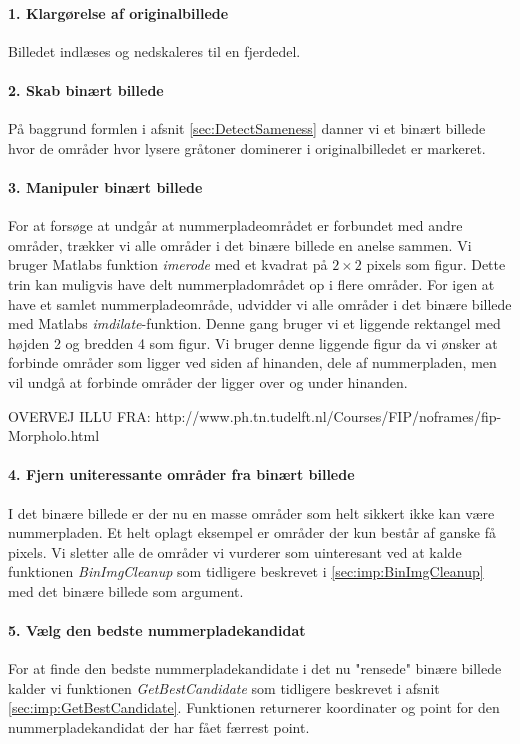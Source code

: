 \paragraph{1. Klargørelse af originalbillede}
Billedet indlæses og nedskaleres til en fjerdedel. 

\paragraph{2. Skab binært billede}
På baggrund formlen i afsnit \ref{sec:DetectSameness} danner vi et binært billede hvor de områder hvor lysere gråtoner dominerer i originalbilledet er markeret.

\paragraph{3. Manipuler binært billede}
For at forsøge at undgår at nummerpladeområdet er forbundet med andre områder, trækker vi alle områder i det binære billede en anelse sammen. Vi bruger Matlabs funktion \textit{imerode} med et kvadrat på $2 \times 2$ pixels som figur. Dette trin kan muligvis have delt nummerpladområdet op i flere områder. For igen at have et samlet nummerpladeområde, udvidder vi alle områder i det binære billede med Matlabs \textit{imdilate}-funktion. Denne gang bruger vi et liggende rektangel med højden 2 og bredden 4 som figur. Vi bruger denne liggende figur da vi ønsker at forbinde områder som ligger ved siden af hinanden, dele af nummerpladen, men vil undgå at forbinde områder der ligger over og under hinanden. 

OVERVEJ ILLU FRA: http://www.ph.tn.tudelft.nl/Courses/FIP/noframes/fip-Morpholo.html

\paragraph{4. Fjern uniteressante områder fra binært billede}
I det binære billede er der nu en masse områder som helt sikkert ikke kan være nummerpladen. Et helt oplagt eksempel er områder der kun består af ganske få pixels. Vi sletter alle de områder vi vurderer som uinteresant ved at kalde funktionen \textit{BinImgCleanup} som tidligere beskrevet i \vref{sec:imp:BinImgCleanup} med det binære billede som argument.

\paragraph{5. Vælg den bedste nummerpladekandidat}
For at finde den bedste nummerpladekandidate i det nu "rensede" binære billede kalder vi funktionen \textit{GetBestCandidate} som tidligere beskrevet i afsnit \vref{sec:imp:GetBestCandidate}. Funktionen returnerer koordinater og point for den nummerpladekandidat der har fået færrest point. 

